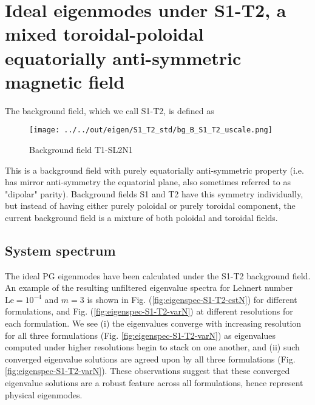 \section{Ideal eigenmodes under S1-T2, a mixed toroidal-poloidal equatorially anti-symmetric magnetic field}

The background field, which we call S1-T2, is defined as

\begin{figure}[ht]
    \centering
    \texttt{[image: ../../out/eigen/S1\_T2\_std/bg\_B\_S1\_T2\_uscale.png]}
    \caption{Background field T1-SL2N1}
\end{figure}

This is a background field with purely equatorially anti-symmetric property (i.e. has mirror anti-symmetry \wrt the equatorial plane, also sometimes referred to as "dipolar" parity). Background fields S1 and T2 have this symmetry individually, but instead of having either purely poloidal or purely toroidal component, the current background field is a mixture of both poloidal and toroidal fields.


\subsection{System spectrum}

The ideal PG eigenmodes have been calculated under the S1-T2 background field. An example of the resulting unfiltered eigenvalue spectra for Lehnert number $\mathrm{Le}=10^{-4}$ and $m=3$ is shown in Fig. (\ref{fig:eigenspec-S1-T2-cstN}) for different formulations, and Fig. (\ref{fig:eigenspec-S1-T2-varN}) at different resolutions for each formulation. We see (i) the eigenvalues converge with increasing resolution for all three formulations (Fig. \ref{fig:eigenspec-S1-T2-varN}) as eigenvalues computed under higher resolutions begin to stack on one another, and (ii) such converged eigenvalue solutions are agreed upon by all three formulations (Fig. \ref{fig:eigenspec-S1-T2-varN}). These observations suggest that these converged eigenvalue solutions are a robust feature across all formulations, hence represent physical eigenmodes.

